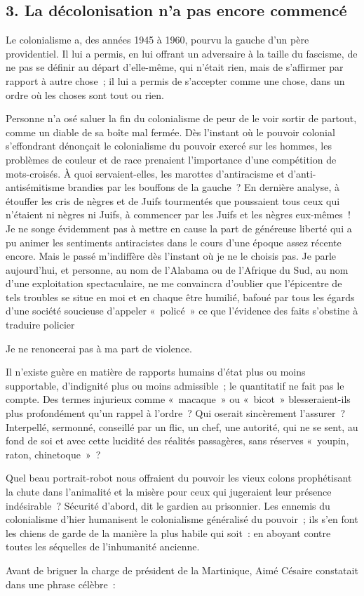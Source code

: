 \documentclass[french,twoside]{book} %
\begin{document}
\subsection[{3. La décolonisation n’a pas encore commencé}]{\textsc{3.} La décolonisation n’a pas encore commencé}
\noindent Le colonialisme a, des années 1945 à 1960, pourvu la gauche d’un père providentiel. Il lui a permis, en lui offrant un adversaire à la taille du fascisme, de ne pas se définir au départ d’elle-même, qui n’était rien, mais de s’affirmer par rapport à autre chose ; il lui a permis de s’accepter comme une chose, dans un ordre où les choses sont tout ou rien.\par
Personne n’a osé saluer la fin du colonialisme de peur de le voir sortir de partout, comme un diable de sa boîte mal fermée. Dès l’instant où le pouvoir colonial s’effondrant dénonçait le colonialisme du pouvoir exercé sur les hommes, les problèmes de couleur et de race prenaient l’importance d’une compétition de mots-croisés. À quoi servaient-elles, les marottes d’antiracisme et d’anti-antisémitisme brandies par les bouffons de la gauche ? En dernière analyse, à étouffer les cris de nègres et de Juifs tourmentés que poussaient tous ceux qui n’étaient ni nègres ni Juifs, à commencer par les Juifs et les nègres eux-mêmes ! Je ne songe évidemment pas à mettre en cause la part de généreuse liberté qui a pu animer les sentiments antiracistes dans le cours d’une époque assez récente encore. Mais le passé m’indiffère dès l’instant où je ne le choisis pas. Je parle aujourd’hui, et personne, au nom de l’Alabama ou de l’Afrique du Sud, au nom d’une exploitation spectaculaire, ne me convaincra d’oublier que l’épicentre de tels troubles se situe en moi et en chaque être humilié, bafoué par tous les égards d’une société soucieuse d’appeler « policé » ce que l’évidence des faits s’obstine à traduire policier\par
Je ne renoncerai pas à ma part de violence.\par
Il n’existe guère en matière de rapports humains d’état plus ou moins supportable, d’indignité plus ou moins admissible ; le quantitatif ne fait pas le compte. Des termes injurieux comme « macaque » ou « bicot » blesseraient-ils plus profondément qu’un rappel à l’ordre ? Qui oserait sincèrement l’assurer ? Interpellé, sermonné, conseillé par un flic, un chef, une autorité, qui ne se sent, au fond de soi et avec cette lucidité des réalités passagères, sans réserves « youpin, raton, chinetoque » ?\par
Quel beau portrait-robot nous offraient du pouvoir les vieux colons prophétisant la chute dans l’animalité et la misère pour ceux qui jugeraient leur présence indésirable ? Sécurité d’abord, dit le gardien au prisonnier. Les ennemis du colonialisme d’hier humanisent le colonialisme généralisé du pouvoir ; ils s’en font les chiens de garde de la manière la plus habile qui soit : en aboyant contre toutes les séquelles de l’inhumanité ancienne.\par
Avant de briguer la charge de président de la Martinique, Aimé Césaire constatait dans une phrase célèbre :\par
\end{document}
